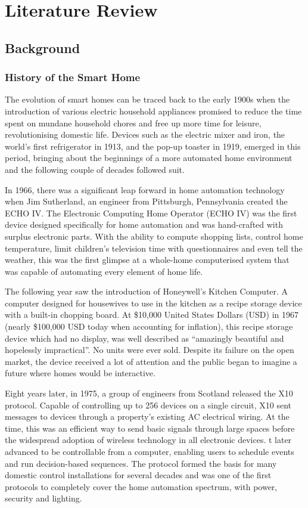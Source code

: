 \chapter{Literature Review}\label{ch:lit_review}

\section{Background}

\subsection{History of the Smart Home}
The evolution of smart homes can be traced back to the early 1900s when the introduction of various electric household appliances promised to reduce the time spent on mundane household chores and free up more time for leisure, revolutionising domestic life.
Devices such as the electric mixer and iron, the world's first refrigerator in 1913, and the pop-up toaster in 1919, emerged in this period, bringing about the beginnings of a more automated home environment and the following couple of decades followed suit.

In 1966, there was a significant leap forward in home automation technology when Jim Sutherland, an engineer from Pittsburgh, Pennsylvania created the ECHO IV.
The Electronic Computing Home Operator (ECHO IV) was the first device designed specifically for home automation and was hand-crafted with surplus electronic parts.
With the ability to compute shopping lists, control home temperature, limit children's television time with questionnaires and even tell the weather, this was the first glimpse at a whole-home computerised system that was capable of automating every element of home life.

The following year saw the introduction of Honeywell's Kitchen Computer. A computer designed for housewives to use in the kitchen as a recipe storage device with a built-in chopping board.
At \$10,000 United States Dollars (USD) in 1967 (nearly \$100,000 USD today when accounting for inflation), this recipe storage device which had no display, was well described as ``amazingly beautiful and hopelessly impractical''.
No units were ever sold.
Despite its failure on the open market, the device received a lot of attention and the public began to imagine a future where homes would be interactive.

Eight years later, in 1975, a group of engineers from Scotland released the X10 protocol.
Capable of controlling up to 256 devices on a single circuit, X10 sent messages to devices through a property's existing AC electrical wiring.
At the time, this was an efficient way to send basic signals through large spaces before the widespread adoption of wireless technology in all electronic devices.
t later advanced to be controllable from a computer, enabling users to schedule events and run decision-based sequences.
The protocol formed the basis for many domestic control installations for several decades and was one of the first protocols to completely cover the home automation spectrum, with power, security and lighting.

